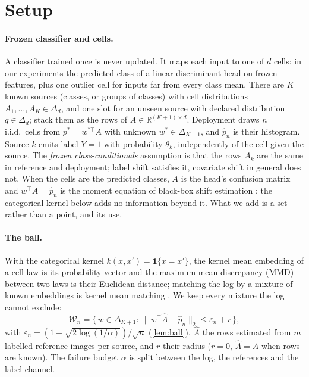 \section{Setup}
\label{sec:setup}

\paragraph{Frozen classifier and cells.} A classifier trained once is never updated. It maps each
input to one of $d$ cells: in our experiments the predicted class of a linear-discriminant head on
frozen features, plus one outlier cell for inputs far from every class mean. There are $K$ known
sources (classes, or groups of classes) with cell distributions $A_1,\dots,A_K\in\Delta_d$, and one
slot for an unseen source with declared distribution $q\in\Delta_d$; stack them as the rows of
$A\in\mathbb{R}^{(K+1)\times d}$. Deployment draws $n$ i.i.d.\ cells from $p^{*}=w^{*\top}A$ with
unknown $w^{*}\in\Delta_{K+1}$, and $\hat p_n$ is their histogram. Source $k$ emits label $Y=1$ with
probability $\theta_k$, independently of the cell given the source. The \emph{frozen
class-conditionals} assumption is that the rows $A_k$ are the same in reference and deployment;
label shift satisfies it, covariate shift in general does not. When the cells are the predicted
classes, $A$ is the head's confusion matrix and $w^{\top}A=\hat p_n$ is the moment equation of
black-box shift estimation \citep{lipton2018detecting}; the categorical kernel below adds no
information beyond it. What we add is a set rather than a point, and its use.

\paragraph{The ball.} With the categorical kernel $k(x,x')=\mathbf 1\{x=x'\}$, the kernel mean
embedding of a cell law is its probability vector and the maximum mean discrepancy (MMD) between two
laws is their Euclidean distance; matching the log by a mixture of known embeddings is kernel mean
matching \citep{zhang2013domain,iyer2014maximum}. We keep every mixture the log cannot exclude:
\begin{equation}
\mathcal W_n=\{\,w\in\Delta_{K+1}:\ \lVert w^{\top}\hat A-\hat p_n\rVert_2\le \varepsilon_n+r\,\},
\label{eq:ball}
\end{equation}
with $\varepsilon_n=(1+\sqrt{2\log(1/\alpha)})/\sqrt n$ (\cref{lem:ball}), $\hat A$ the rows estimated
from $m$ labelled reference images per source, and $r$ their radius ($r=0$, $\hat A=A$ when rows are
known). The failure budget $\alpha$ is split between the log, the references and the label channel.

